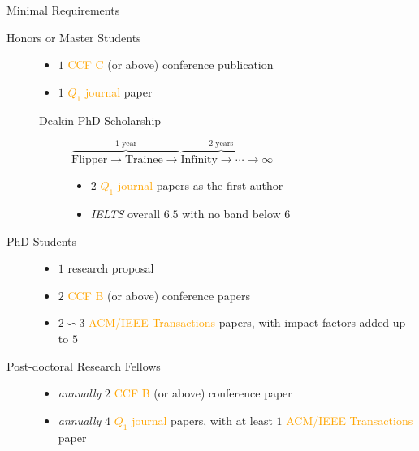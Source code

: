\documentclass[
 size=14pt,
 paper=smartboard,  %
 mode=present, 		%
 display=slides, 	%
 style=tuliplab,  	%
 pauseslide,
 fleqn,leqno]{powerdot}{}
\begin{document}
\begin{slide}{Minimal Requirements}
\begin{description}
\item[Honors or Master Students]
    \begin{itemize}
        \item $1$ \textcolor{orange}{CCF C} (or above) conference publication
        \item $1$ \textcolor{orange}{$Q_1$ journal} paper
    \end{itemize}
    \begin{description}
  		\item[Deakin PhD Scholarship]
$\overbrace{\text{Flipper} \rightarrow \text{Trainee} \rightarrow}^{\text{1 year}}
\overbrace{\text{Infinity} \rightarrow \cdots \rightarrow }^{\text{2 years}} \infty$
    		\begin{itemize}
        		\item $2$ \textcolor{orange}{$Q_1$ journal} papers as the first author
        		\item \textit{IELTS} overall $6.5$ with no band below $6$
    		\end{itemize}
	\end{description}


\item[PhD Students]
    \begin{itemize}
        \item $1$ research proposal
        \item $2$ \textcolor{orange}{CCF B} (or above) conference papers
        \item $2 \backsim 3$ \textcolor{orange}{ACM/IEEE Transactions} papers,
        with impact factors added up to $5$
    \end{itemize}

\item[Post-doctoral Research Fellows]
    \begin{itemize}
    \item \textit{annually} $2$ \textcolor{orange}{CCF B} (or above) conference paper
    \item \textit{annually} $4$ \textcolor{orange}{$Q_1$ journal} papers,
     with at least $1$ \textcolor{orange}{ACM/IEEE Transactions} paper
    \end{itemize}

\end{description}
\end{slide}
\end{document}
